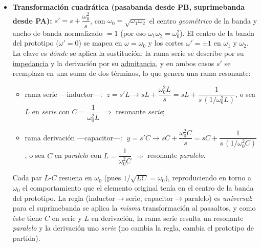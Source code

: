 \documentclass[class=article, crop=false, oneside]{standalone}
\begin{document}
\begin{itemize}
    ($0<\omega'<\omega_c$) se mapea en la del pasaaltos ($\omega_c<\omega<\infty$).
    En los elementos: un inductor $s'L\to \dfrac{L}{s}=\dfrac{1}{s\,(1/L)}$, esto es
    un \emph{capacitor} $1/L$; un capacitor $\dfrac{1}{s'C}\to \dfrac{s}{C}=s\,(1/C)$,
    esto es un \emph{inductor} $1/C$. En síntesis, cada inductor se vuelve capacitor
    y cada capacitor inductor, con valor recíproco.
    \item \textbf{Transformación cuadrática (pasabanda desde PB, suprimebanda desde
    PA):} $s' = s + \dfrac{\omega_0^2}{s}$, con $\omega_0 = \sqrt{\omega_1\omega_2}$
    el centro \emph{geométrico} de la banda y ancho de banda normalizado $=1$ (por
    eso $\omega_1\omega_2=\omega_0^2$). El centro de la banda del prototipo
    ($\omega'=0$) se mapea en $\omega=\omega_0$ y los cortes $\omega'=\pm1$ en
    $\omega_1$ y $\omega_2$. La clave es \emph{dónde} se aplica la sustitución: la
    rama serie se describe por su \underline{impedancia} y la derivación por su
    \underline{admitancia}, y en ambos casos $s'$ se reemplaza en una suma de dos
    términos, lo que genera una rama resonante:
    \begin{itemize}\setlength{\itemsep}{1pt}
        \item rama serie ---inductor---: $\;z = s'L \to sL + \dfrac{\omega_0^2 L}{s}
        = sL + \dfrac{1}{s\,\left(1/\omega_0^2 L\right)}$, o sea $L$ en \emph{serie}
        con $C=\dfrac{1}{\omega_0^2 L}$ $\Rightarrow$ resonante \emph{serie};
        \item rama derivación ---capacitor---: $\;y = s'C \to sC + \dfrac{\omega_0^2 C}{s}
        = sC + \dfrac{1}{s\,\left(1/\omega_0^2 C\right)}$, o sea $C$ en \emph{paralelo}
        con $L=\dfrac{1}{\omega_0^2 C}$ $\Rightarrow$ resonante \emph{paralelo}.
    \end{itemize}
    Cada par $L$-$C$ resuena en $\omega_0$ (pues $1/\sqrt{LC}=\omega_0$),
    reproduciendo en torno a $\omega_0$ el comportamiento que el elemento original
    tenía en el centro de la banda del prototipo. La regla (inductor$\to$serie,
    capacitor$\to$paralelo) es \emph{universal}: para el suprimebanda se aplica la
    \emph{misma} transformación al pasaaltos, y como éste tiene $C$ en serie y $L$
    en derivación, la rama serie resulta un resonante \emph{paralelo} y la
    derivación uno \emph{serie} (no cambia la regla, cambia el prototipo de partida).
\end{itemize}
\end{document}
